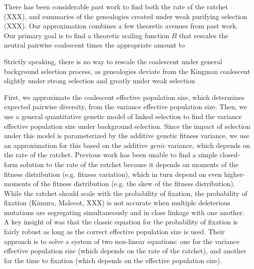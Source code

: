 \documentclass[11pt]{article}
\DeclareMathOperator{\var}{var}
\begin{document}







There has been considerable past work to find both the rate of the ratchet
(XXX), and summaries of the genealogies created under weak purifying selection
(XXX). Our approximation combines a few theoretic avenues from past work. Our
primary goal is to find a theoretic scaling function $B$ that rescales the neutral
pairwise coalescent times the appropriate amount to 

Strictly speaking, there is no way to rescale the coalescent under general
background selection process, as genealogies deviate from the Kingman
coalescent slightly under strong selection
\parencite{Walczak2012-fi,Cvijovic2018-vd} and greatly under weak selection
\parencite{OFallon2010-my}

First, we approximate the coalescent effective population size, which
determines expected pairwise diversity, from the variance effective population
size. Then, we use a general quantitative genetic model of linked selection to
find the variance effective population size under background selection. Since
the impact of selection under this model is parameterized by the additive
genetic fitness variance, we use an approximation for this based on the
additive \emph{genic} variance, which depends on the rate of the ratchet.
Previous work has been unable to find a simple closed-form solution to the rate
of the ratchet because it depends on moments of the fitness distribution (e.g.
fitness variation), which in turn depend on even higher-moments of the fitness
distribution (e.g. the skew of the fitness distribution). While the ratchet
should scale with the probability of fixation, the probability of fixation
(Kimura, Malecot, XXX) is not accurate when multiple deleterious mutations are
segregating simultaneously and in close linkage with one another. A key insight
of \textcite{Santiago2016-mu} was that the classic equation for the probability
of fixation is fairly robust as long as the correct effective population size
is used. Their approach is to solve a system of two non-linear equations: one
for the variance effective population size (which depends on the rate of the
ratchet), and another for the time to fixation (which depends on the effective
population size).
\end{document}
